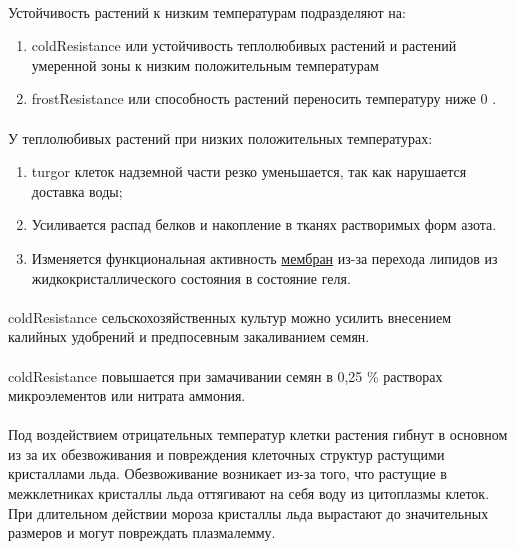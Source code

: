 \paragraph*{}Устойчивость растений к низким температурам подразделяют на:

\begin{enumerate}
	\item \gls{coldResistance} или устойчивость теплолюбивых растений и растений умеренной зоны к низким положительным температурам
	\item \gls{frostResistance} или способность растений переносить температуру ниже 0 \celsius.
\end{enumerate}

\paragraph*{}У теплолюбивых растений при низких положительных температурах:

\begin{enumerate}
	\item \gls{turgor} клеток надземной части резко уменьшается, так как нарушается доставка воды;
	\item Усиливается распад белков и накопление в тканях растворимых форм азота. 
	\item Изменяется функциональная активность \hyperlink{plasmolema}{мембран} из-за перехода липидов из жидкокристаллического состояния в состояние геля.
\end{enumerate}

\paragraph*{}\gls{coldResistance} сельскохозяйственных культур можно усилить внесением калийных удобрений и  предпосевным закаливанием семян. 


\paragraph*{}\gls{coldResistance} повышается при замачивании семян в 0,25 \% растворах микроэлементов или нитрата аммония.

\paragraph*{}Под воздействием отрицательных температур клетки растения гибнут в основном из за их обезвоживания и повреждения клеточных структур растущими кристаллами льда. Обезвоживание возникает из-за того, что растущие в межклетниках кристаллы льда оттягивают на себя воду из цитоплазмы клеток. При длительном действии мороза кристаллы льда вырастают до значительных размеров и могут повреждать плазмалемму.

